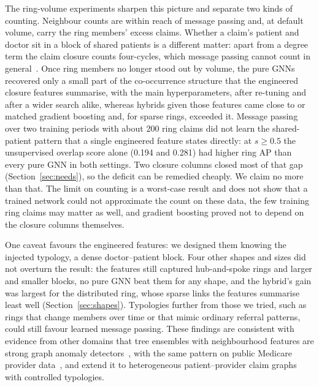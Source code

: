 \documentclass[pdflatex,sn-vancouver-num]{sn-jnl}
\begin{document}
The ring-volume experiments sharpen this picture and separate two kinds of
counting. Neighbour counts are within reach of message passing and, at default
volume, carry the ring members' excess claims. Whether a claim's patient and
doctor sit in a block of shared patients is a different matter: apart from a
degree term the claim closure counts four-cycles, which message passing cannot
count in general~\cite{chen2020count}. Once ring members no
longer stood out by volume, the pure GNNs
recovered only a small part of the co-occurrence structure that the
engineered closure features summarise, with the main hyperparameters, after
re-tuning and after a wider search alike, whereas hybrids given those features came close to or
matched gradient boosting and, for sparse rings, exceeded it. Message passing
over two training periods with about 200 ring claims did not learn the
shared-patient pattern that a single engineered feature states directly: at
$s\ge0.5$ the unsupervised overlap score alone (0.194 and 0.281) had higher
ring AP than every pure GNN in both settings. Two closure columns closed most
of that gap (Section~\ref{sec:needs}), so the deficit can be remedied cheaply.
We claim no more than that. The limit on counting is a worst-case result and
does not show that a trained network could not approximate the count on these
data, the few training ring claims may matter as well, and gradient boosting
proved not to depend on the closure columns themselves.

One caveat favours the engineered features: we designed them knowing the
injected typology, a dense doctor--patient block. Four other shapes and sizes
did not overturn the result: the features still captured hub-and-spoke rings
and larger and smaller blocks, no pure GNN beat them for any shape, and the
hybrid's gain was largest for the distributed ring, whose sparse links the
features summarise least well (Section~\ref{sec:shapes}). Typologies further
from those we tried, such as rings that change members over time or that
mimic ordinary referral patterns, could still favour learned message
passing. These findings are consistent with
evidence from other domains that tree ensembles with neighbourhood features
are strong graph anomaly
detectors~\cite{weber2019elliptic,tang2023gadbench,bazhenov2025graphland},
with the same pattern on public Medicare provider data~\cite{yoo2023}, and
extend it to heterogeneous patient--provider claim graphs with controlled
typologies.
\end{document}
